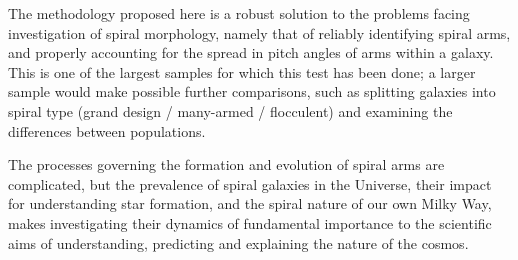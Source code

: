 The methodology proposed here is a robust solution to the problems facing investigation of spiral morphology, namely that of reliably identifying spiral arms, and properly accounting for the spread in pitch angles of arms within a galaxy. This is one of the largest samples for which this test has been done; a larger sample would make possible further comparisons, such as splitting galaxies into spiral type (grand design / many-armed / flocculent) and examining the differences between populations.

The processes governing the formation and evolution of spiral arms are complicated, but the prevalence of spiral galaxies in the Universe, their impact for understanding star formation, and the spiral nature of our own Milky Way, makes investigating their dynamics of fundamental importance to the scientific aims of understanding, predicting and explaining the nature of the cosmos.
